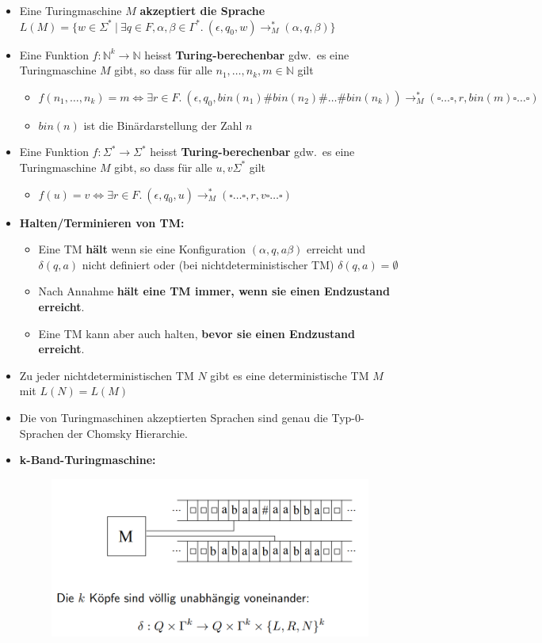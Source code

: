 \documentclass[ieeetran]{article}
\begin{document}
\begin{itemize}
\item Eine Turingmaschine $M$ \textbf{akzeptiert die Sprache} $L(M) = \{w \in \Sigma^* \ | \ \exists q \in F, \alpha, \beta \in \Gamma^*. \ (\epsilon,q_0,w) \rightarrow^*_M (\alpha,q,\beta)\}$
\item Eine Funktion $f:\mathbb{N}^k \rightarrow \mathbb{N}$ heisst \textbf{Turing-berechenbar} gdw.\ es eine Turingmaschine $M$ gibt, so dass für alle $n_1, \ldots, n_k, m \in \mathbb{N}$ gilt
	\begin{itemize}
	  \item $f(n_1, \ldots, n_k) = m \Leftrightarrow \exists r \in F. \ (\epsilon, q_0, bin(n_1)\#bin(n_2)\#\ldots\#bin(n_k)) \rightarrow_M^* (\square \ldots \square,r,bin(m)\square \ldots \square)$
		  \item $bin(n)$ ist die Binärdarstellung der Zahl $n$
	\end{itemize}
	\item Eine Funktion $f:\Sigma^* \rightarrow \Sigma^*$ heisst \textbf{Turing-berechenbar} gdw.\ es eine Turingmaschine $M$ gibt, so dass für alle $u,v\Sigma^*$ gilt
		\begin{itemize}
		  \item $f(u) = v \Leftrightarrow \exists r \in F. \ (\epsilon, q_0, u) \rightarrow_M^* (\square \ldots \square ,r,v \square \ldots \square)$
		\end{itemize}
		\item \textbf{Halten/Terminieren von TM:}
\begin{itemize}
  \item Eine TM \textbf{hält} wenn sie eine Konfiguration $(\alpha, q, a \beta)$ erreicht und $\delta(q,a)$ nicht definiert oder (bei nichtdeterministischer TM) $\delta(q,a) = \emptyset$
	  \item Nach Annahme \textbf{hält eine TM immer, wenn sie einen Endzustand erreicht}.
		  \item Eine TM kann aber auch halten, \textbf{bevor sie einen Endzustand erreicht}.
\end{itemize}
\item Zu jeder nichtdeterministischen TM $N$ gibt es eine deterministische TM $M$ mit $L(N) = L(M)$
	\item Die von Turingmaschinen akzeptierten Sprachen sind genau die Typ-0-Sprachen der Chomsky Hierarchie.
	\item \textbf{k-Band-Turingmaschine:}
		\begin{figure}[h!]
		  \centering
		  \includegraphics[width=0.4\linewidth]{kbandtm}
		  \label{fig:kbandtm}
		\end{figure}



\end{itemize}
\end{document}
